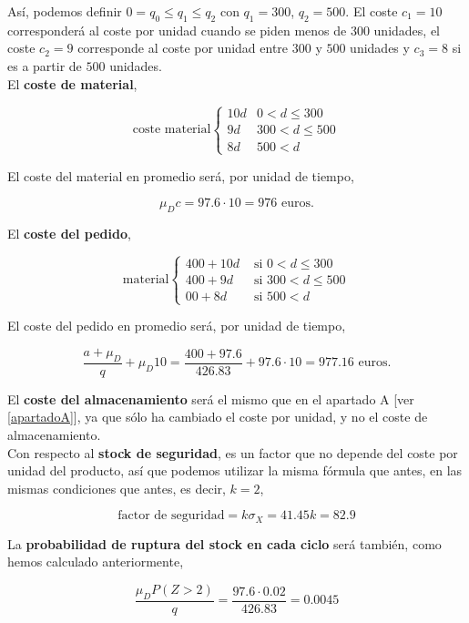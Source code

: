 \documentclass[a4paper,12pt]{article}
\begin{document}
As\'i, podemos definir $0 = q_0 \leq q_1 \leq q_2$ con $q_1 = 300$, $q_2 = 500$. El coste $c_1 = 10$ corresponder\'a al coste por unidad cuando se piden menos de $300$ unidades, el coste $c_2 = 9$ corresponde al coste por unidad entre $300$ y $500$ unidades y $c_3 = 8$ si es a partir de $500$ unidades.\\

El \textbf{coste de material},

\begin{equation*}
\text{coste material} \left\lbrace \begin{array}{ll}
	10d & 0 < d \leq 300\\
	9d  & 300 < d \leq 500 \\
	8d  & 500 < d
\end{array}
	\right.
\end{equation*}

El coste del material en promedio ser\'a, por unidad de tiempo, 

$$ \mu_D c = 97.6 \cdot 10 = 976\text{ euros.}$$ 

El \textbf{coste del pedido},

\begin{equation*}
\text{material} \left\lbrace \begin{array}{ll}
	400 + 10d & \text{ si } 0 < d \leq 300\\
	400 + 9d  & \text{ si } 300 < d \leq 500 \\
	00 + 8d   & \text{ si } 500 < d
\end{array}
	\right.
\end{equation*}

El coste del pedido en promedio ser\'a, por unidad de tiempo,

$$ \dfrac{a + \mu_D}{q} + \mu_D 10 = \dfrac{400 + 97.6}{426.83} + 97.6\cdot 10 = 977.16 \text{ euros.} $$

\smallskip

El \textbf{coste del almacenamiento} ser\'a el mismo que en el apartado A [ver \ref{apartadoA}], ya que s\'olo ha cambiado el coste por unidad, y no el coste de almacenamiento. \\

Con respecto al \textbf{stock de seguridad}, es un factor que no depende del coste por unidad del producto, as\'i que podemos utilizar la misma f\'ormula que antes, en las mismas condiciones que antes, es decir, $k=2$,

$$ \text{factor de seguridad} = k\sigma_X = 41.45k = 82.9$$

\smallskip

La \textbf{probabilidad de ruptura del stock en cada ciclo} ser\'a tambi\'en, como hemos calculado anteriormente,

$$\dfrac{\mu_D P(Z > 2)}{q} = \dfrac{97.6\cdot 0.02}{426.83} = 0.0045$$ 
	
\end{document}
